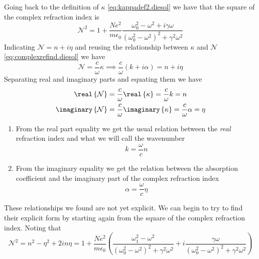 \documentclass[../electromagnetism.tex]{subfiles}
\begin{document}
Going back to the definition of $\kappa$ \eqref{eq:kappadef2.diesol} we have that the square of the complex refraction index is
\begin{equation}
	\mathcal{N}^2=1+\frac{Ne^2}{m\epsilon_0}\frac{\omega_0^2-\omega^2+i\gamma\omega}{\left( \omega_0^2-\omega^2 \right)^2+\gamma^2\omega^2}
	\label{eq:squarecri.diesol}
\end{equation}
Indicating $\mathcal{N}=n+i\eta$ and reusing the relationship between $\kappa$ and $\mathcal{N}$ \eqref{eq:complexrefind.diesol} we have
\begin{equation}
	\mathcal{N}=\frac{c}{\omega}\kappa\implies\frac{c}{\omega}\left( k+i\alpha \right)=n+i\eta
	\label{eq:relations2.diesol}
\end{equation}
Separating real and imaginary parts and equating them we have
\begin{equation}
	\begin{aligned}
		\real\left\{ \mathcal{N} \right\}&= \frac{c}{\omega}\real\left\{ \kappa \right\}=\frac{c}{\omega}k=n\\
		\imaginary\left\{ \mathcal{N} \right\}&= \frac{c}{\omega}\imaginary\left\{ \kappa \right\}=\frac{c}{\omega}\alpha=\eta
	\end{aligned}
		\label{eq:relations3.diesol}
\end{equation}
\begin{enumerate}
\item From the real part equality we get the usual relation between the \textit{real} refraction index and what we will call the wavenumber
	\begin{equation*}
		k=\frac{\omega}{c}n
	\end{equation*}
\item From the imaginary equality we get the relation between the absorption coefficient and the imaginary part of the complex refraction index
	\begin{equation*}
		\alpha=\frac{\omega}{c}\eta
	\end{equation*}
\end{enumerate}
These relationships we found are not yet explicit. We can begin to try to find their explicit form by starting again from the square of the complex refraction index. Noting that
\begin{equation*}
	\mathcal{N}^2=n^2-\eta^2+2in\eta=1+\frac{Ne^2}{m\epsilon_0}\left( \frac{\omega_1^2-\omega^2}{\left( \omega_0^2-\omega^2 \right)^2+\gamma^2\omega^2}+i\frac{\gamma\omega}{\left( \omega_0^2-\omega^2 \right)^2+\gamma^2\omega^2} \right)
\end{equation*}
\end{document}
